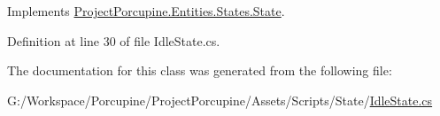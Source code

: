 Implements \hyperlink{class_project_porcupine_1_1_entities_1_1_states_1_1_state_a46337df73c448f5dd84e350e987af8b5}{Project\+Porcupine.\+Entities.\+States.\+State}.



Definition at line 30 of file Idle\+State.\+cs.



The documentation for this class was generated from the following file\+:\begin{DoxyCompactItemize}
\item 
G\+:/\+Workspace/\+Porcupine/\+Project\+Porcupine/\+Assets/\+Scripts/\+State/\hyperlink{_idle_state_8cs}{Idle\+State.\+cs}\end{DoxyCompactItemize}
